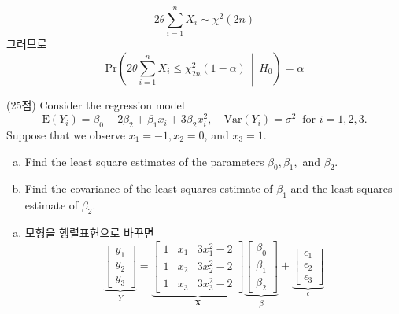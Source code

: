 \documentclass[answers]{exam}
\begin{document}
\begin{questions}
\begin{solution}
\begin{enumerate}[(a)]
        \begin{equation}
          2\theta\sum_{i=1}^{n}X_{i}\sim\chi^{2}\left(2n\right)
        \end{equation}
        그러므로
        \begin{equation}
          \mathrm{Pr}\left(2\theta\sum_{i=1}^{n}X_{i}\leq \chi_{2n}^{2}\left(1-\alpha\right)\,\middle|\,H_{0}\right)=\alpha
        \end{equation}
      \end{enumerate}
    \end{solution}
    \question
    (25점) Consider the regression model
    \begin{equation}
      \mathrm{E}\left(Y_{i}\right) = \beta_{0}-2\beta_{2}+\beta_{1}x_{i}+3\beta_{2}x_{i}^{2},\quad \mathrm{Var}\left(Y_{i}\right)=\sigma^{2}\;\;\text{for } i=1,2,3.
    \end{equation}
    Suppose that we observe $x_{1}=-1, x_{2}=0$, and $x_{3}=1$.
    \begin{enumerate}[(a)]
      \item Find the least square estimates of the parameters $\beta_{0},\beta_{1},$ and $\beta_{2}$.
      \item Find the covariance of the least squares estimate of $\beta_{1}$ and the least squares estimate of $\beta_{2}$.
    \end{enumerate}
    \begin{solution}
      \begin{enumerate}[(a)]
        \item 모형을 행렬표현으로 바꾸면
        \begin{equation}
          \underbrace{\begin{bmatrix}y_{1}\\y_{2}\\y_{3} \end{bmatrix}}_{Y} = \underbrace{\begin{bmatrix}1 & x_{1}& 3x_{1}^{2}-2\\ 1 & x_{2} & 3x_{2}^{2}-2 \\1 & x_{3} & 3x_{3}^{2}-2 \end{bmatrix}}_{\mathbf{X}}\underbrace{\begin{bmatrix}\beta_{0}\\ \beta_{1}\\\beta_{2} \end{bmatrix}}_{\beta}+\underbrace{\begin{bmatrix}\epsilon_{1}\\ \epsilon_{2}\\ \epsilon_{3} \end{bmatrix}}_{\epsilon}

\end{equation}
\end{enumerate}
\end{solution}
\end{questions}
\end{document}
